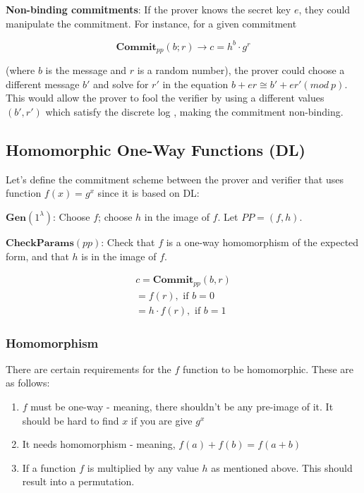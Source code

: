 \documentclass{article}
\begin{document}
\textbf{Non-binding commitments}: If the prover knows the secret key $e$, they could manipulate the commitment. For instance, for a given commitment 

\[
\mathbf{Commit}_{pp}(b;r) \rightarrow c = h^b \cdot g^r
\]

(where $b$ is the message and $r$ is a random number), the prover could choose a different message $b'$ and solve for $r'$ in the equation $b + er \cong b' + er' (mod \: p)$. This would allow the prover to fool the verifier by using a different values $(b', r')$ which satisfy the discrete log , making the commitment non-binding.


\subsection{Homomorphic One-Way Functions (DL)}

Let's define the commitment scheme between the prover and verifier that uses function $f(x) = g^x$ since it is based on DL:

$\mathbf{Gen}(1^{\lambda})$: Choose $f$; choose $h$ in the image of $f$. Let $PP = (f,h)$.

$\mathbf{CheckParams}(pp)$: Check that $f$ is a one-way homomorphism of the expected form, and that $h$ is in the image of $f$.

\begin{align*}
    c = \mathbf{Commit}_{pp}(b,r) \\
    = f(r), \text{ if } b = 0 \\
    = h \cdot f(r), \text{ if } b = 1
\end{align*}


\subsubsection{Homomorphism}
There are certain requirements for the $f$ function to be homomorphic. These are as follows:

\begin{enumerate}
    \item $f$ must be one-way - meaning, there shouldn't be any pre-image of it. It should be hard to find $x$ if you are give $g^x$
    \item It needs homomorphism - meaning, $f(a) + f(b) = f(a+b)$
    \item If a function $f$ is multiplied by any value $h$ as mentioned above. This should result into a permutation.
\end{enumerate}
\end{document}
